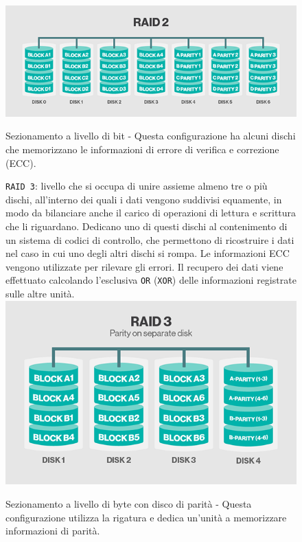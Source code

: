 \begin{itemize}
\begin{figure}[htbp]
\centering
\includegraphics[scale=0.50]{img/raid22.png}\\
\caption{Sezionamento a livello di bit - Questa configurazione ha alcuni dischi che memorizzano le informazioni di errore di verifica e correzione (ECC).\label{figura1.6} \cite{etichetta9}}
\end{figure}

\begin{figure}[htbp]
\item
\verb"RAID 3": livello che si occupa di unire assieme almeno tre o pi\`{u} dischi, all'interno dei quali i dati vengono suddivisi equamente, in modo da bilanciare anche il carico di operazioni di lettura e scrittura che li riguardano. Dedicano uno di questi dischi al contenimento di un sistema di codici di controllo, che permettono di ricostruire i dati nel caso in cui uno degli altri dischi si rompa. Le informazioni ECC vengono utilizzate per rilevare gli errori. Il recupero dei dati viene effettuato calcolando l'esclusiva \verb"OR" (\verb"XOR") delle informazioni registrate sulle altre unit\`{a}.\cite{etichetta9}\\ %

\centering
\includegraphics[scale=0.40]{img/raid33.png}\\
\caption{Sezionamento a livello di byte con disco di parit\`{a} - Questa configurazione utilizza la rigatura e dedica un'unit\`{a} a memorizzare informazioni di parit\`{a}.\label{figura1.7} \cite{etichetta9}}
\end{figure}


\end{itemize}
